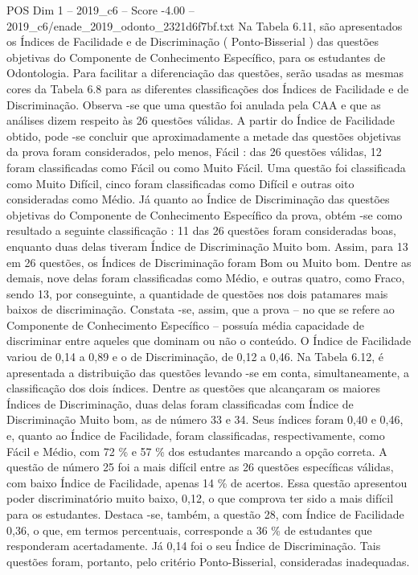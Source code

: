 \begin{textsample}{POS Dim 1 – 2019\_c6 – Score -4.00 – 2019\_c6/enade\_2019\_odonto\_2321d6f7bf.txt}
Na Tabela 6.11, são apresentados os Índices de Facilidade e de Discriminação ( Ponto-Bisserial ) das questões objetivas do Componente de Conhecimento Específico, para os estudantes de Odontologia.
Para facilitar a diferenciação das questões, serão usadas as mesmas cores da Tabela 6.8 para as diferentes classificações dos Índices de Facilidade e de Discriminação.
Observa -se que uma questão foi anulada pela CAA e que as análises dizem respeito às 26 questões válidas.
A partir do Índice de Facilidade obtido, pode -se concluir que aproximadamente a metade das questões objetivas da prova foram considerados, pelo menos, Fácil : das 26 questões válidas, 12 foram classificadas como Fácil ou como Muito Fácil.
Uma questão foi classificada como Muito Difícil, cinco foram classificadas como Difícil e outras oito consideradas como Médio.
Já quanto ao Índice de Discriminação das questões objetivas do Componente de Conhecimento Específico da prova, obtém -se como resultado a seguinte classificação : 11 das 26 questões foram consideradas boas, enquanto duas delas tiveram Índice de Discriminação Muito bom.
Assim, para 13 em 26 questões, os Índices de Discriminação foram Bom ou Muito bom.
Dentre as demais, nove delas foram classificadas como Médio, e outras quatro, como Fraco, sendo 13, por conseguinte, a quantidade de questões nos dois patamares mais baixos de discriminação.
Constata -se, assim, que a prova – no que se refere ao Componente de Conhecimento Específico – possuía média capacidade de discriminar entre aqueles que dominam ou não o conteúdo.
O Índice de Facilidade variou de 0,14 a 0,89 e o de Discriminação, de 0,12 a 0,46.
Na Tabela 6.12, é apresentada a distribuição das questões levando -se em conta, simultaneamente, a classificação dos dois índices.
Dentre as questões que alcançaram os maiores Índices de Discriminação, duas delas foram classificadas com Índice de Discriminação Muito bom, as de número 33 e 34.
Seus índices foram 0,40 e 0,46, e, quanto ao Índice de Facilidade, foram classificadas, respectivamente, como Fácil e Médio, com 72 \% e 57 \% dos estudantes marcando a opção correta.
A questão de número 25 foi a mais difícil entre as 26 questões específicas válidas, com baixo Índice de Facilidade, apenas 14 \% de acertos.
Essa questão apresentou poder discriminatório muito baixo, 0,12, o que comprova ter sido a mais difícil para os estudantes.
Destaca -se, também, a questão 28, com Índice de Facilidade 0,36, o que, em termos percentuais, corresponde a 36 \% de estudantes que responderam acertadamente.
Já 0,14 foi o seu Índice de Discriminação.
Tais questões foram, portanto, pelo critério Ponto-Bisserial, consideradas inadequadas.

\end{textsample}

